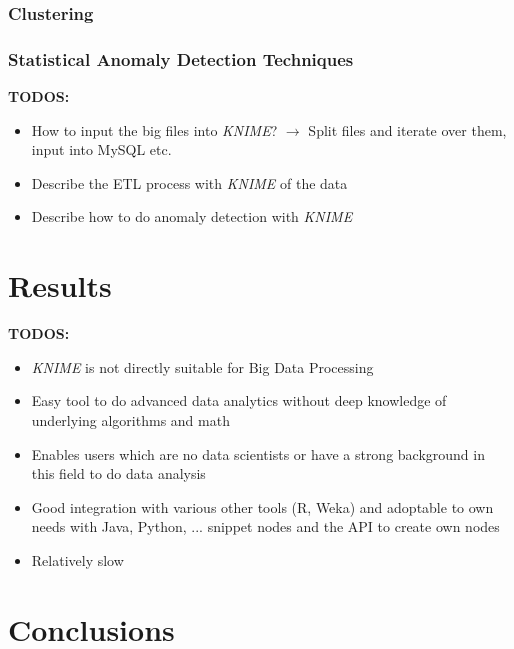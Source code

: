 \documentclass{dima}
\begin{document}
\subsubsection{Clustering}
\subsubsection{Statistical Anomaly Detection Techniques}

\textbf{TODOS:}
\begin{itemize}
\item How to input the big files into \textit{KNIME}? $\rightarrow$ Split files and iterate over them, input into MySQL etc.
\item Describe the ETL process with \textit{KNIME} of the data
\item Describe how to do anomaly detection with \textit{KNIME}
\end{itemize}

\section{Results}
\textbf{TODOS:}
\begin{itemize}
\item \textit{KNIME} is not directly suitable for Big Data Processing
\item Easy tool to do advanced data analytics without deep knowledge of underlying algorithms and math
\item Enables users which are no data scientists or have a strong background in this field to do data analysis
\item Good integration with various other tools (R, Weka) and adoptable to own needs with Java, Python, ... snippet nodes and the API to create own nodes
\item Relatively slow
\end{itemize}


\section{Conclusions}



\end{document}

